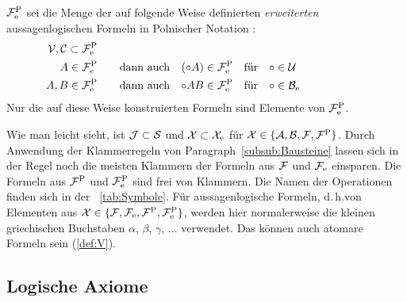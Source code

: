 \documentclass[english,ngerman,parskip=half,headsepline,footsepline,
	fleqn,notitlepage]{scrreprt}
\makeatletter
\newcommand*{\formulatoleft}{&&&&&&&&&&}%
\newcommand*{\subsubsectionname}{Paragraph}
\newcommand*{\textdh}{d.\@\,h.\@ }
\makeatother
\begin{document}
	$\mathcal{F}^\mathrm{P}_\mathrm{e}$ sei die Menge der auf folgende Weise definierten
	\emph{erweiterten} aussagenlogischen Formeln in Polnischer Notation%
	:
	\begin{align}
		\asV, \asC \subset \asFep \\
		A              \in \asFep & \quad \quad \textrm{dann auch} &
		(\circ A)      \in \asFep & & \textrm{für} \quad & \circ \in \asU  \\
		A, B           \in \asFep & \quad \quad \textrm{dann auch} &
		\circ A B      \in \asFep & & \textrm{für} \quad & \circ \in \asBe
		\formulatoleft
	\end{align}
	Nur die auf diese Weise konstruierten Formeln sind Elemente von $\mathcal{F}^\mathrm{P}_\mathrm{e}$.

	Wie man leicht sieht,
	ist $ \mathcal{J} \subset \mathcal{S} $ und $ \mathcal{X} \subset \mathcal{X}_\mathrm{e} $
	für $ \mathcal{X}\in\{ \mathcal{A}, \mathcal{B}, \mathcal{F}, \mathcal{F}^\mathrm{P} \} $.
	Durch Anwendung der Klammerregeln von
	\subsubsectionname~\vref{subsub:Bausteine}
	lassen sich in der Regel noch die meisten Klammern
	der Formeln aus $\mathcal{F}$ und $\mathcal{F}_\mathrm{e}$ einsparen.
	Die Formeln aus $\mathcal{F}^\mathrm{P}$ und $\mathcal{F}^\mathrm{P}_\mathrm{e}$ sind frei von Klammern.
	Die Namen der Operationen finden sich in der \tablename~\vref{tab:Symbole}.
	Für aussagenlogische Formeln,
	\textdh von Elementen aus $\mathcal{X}\in\{ \mathcal{F}, \mathcal{F}_\mathrm{e}, \mathcal{F}^\mathrm{P}, \mathcal{F}^\mathrm{P}_\mathrm{e} \}$,
	werden hier normalerweise die kleinen griechischen Buchstaben
	$\alpha$, $\beta$, $\gamma$, $\dots$ verwendet.
	Das können auch atomare Formeln sein (\seename \eqref{def:V}).

	\subsection{Logische Axiome}%
	\label{sub:Axiome}

	\newcommand*{\asO}{\mathcal{O}}
	\newcommand*{\asObool}{\asO_\mathrm{bool}}
	\newcommand*{\asOand}{\asO_\mathrm{and}}
	\newcommand*{\asOor}{\asO_\mathrm{or}}
	\newcommand*{\asOimp}{\asO_\mathrm{imp}}
	\newcommand*{\asOrep}{\asO_\mathrm{rep}}
	\newcommand*{\asOnand}{\asO_\mathrm{nand}}
	\newcommand*{\asOnor}{\asO_\mathrm{nor}}
\end{document}

